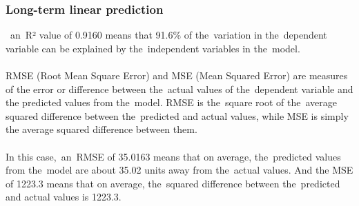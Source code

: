     \subsubsection{Long-term linear prediction} \label{subsec:res_ltlp}
    ~an~R² value of 0.9160 means that 91.6\% of the~variation in the~dependent
    variable can be explained by the~independent variables in the~model.\\
    \\
    RMSE (Root Mean Square Error) and MSE (Mean Squared Error) are measures of the
    error or difference between the~actual values of the~dependent variable and the
    predicted values from the~model. RMSE is the~square root of the~average squared
    difference between the~predicted and actual values, while MSE is simply the
    average squared difference between them.\\
    \\
    In this case,~an~RMSE of 35.0163 means that on average, the~predicted values from
     the~model are about 35.02 units away from the~actual values. And the
    MSE of 1223.3 means that on average, the~squared difference between the~predicted
    and actual values is 1223.3.
